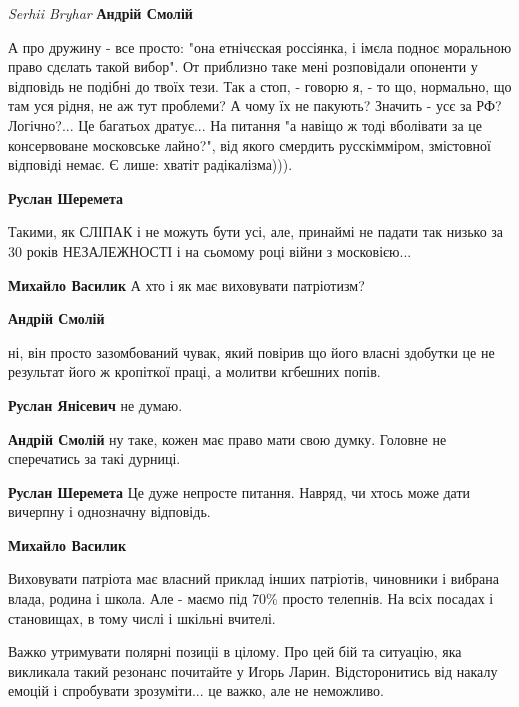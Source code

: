 \begin{itemize}
\begin{itemize}
\emph{Serhii Bryhar}
\textbf{Андрій Смолій} 

А про дружину - все просто: "она етнічєская россіянка, і імєла подноє моральною
право сдєлать такой вибор". От приблизно таке мені розповідали опоненти у
відповідь не подібні до твоїх тези. Так а стоп, - говорю я, - то що, нормально,
що там уся рідня, не аж тут проблеми? А чому їх не пакують? Значить - усє за
РФ? Логічно?... Це багатьох дратує... На питання "а навіщо ж тоді вболівати за
це консервоване московське лайно?", від якого смердить русскімміром, змістовної
відповіді немає. Є лише: хватіт радікалізма))).


\textbf{Руслан Шеремета}

Такими, як СЛІПАК і не можуть бути усі, але, принаймі не падати так низько за
30 років НЕЗАЛЕЖНОСТІ і на сьомому році війни з московією...


\textbf{Михайло Василик} А хто і як має виховувати патріотизм?

\textbf{Андрій Смолій} 

ні, він просто зазомбований чувак, який повірив що його власні здобутки це не
результат його ж кропіткої праці, а молитви кгбешних попів.



\textbf{Руслан Янісевич} не думаю.

\textbf{Андрій Смолій} ну таке, кожен має право мати свою думку. Головне не сперечатись за такі дурниці.

\textbf{Руслан Шеремета}
Це дуже непросте питання. Навряд, чи хтось може дати вичерпну і однозначну відповідь.

\textbf{Михайло Василик} 

Виховувати патріота має власний приклад інших патріотів, чиновники і вибрана
влада, родина і школа. Але - маємо під 70\% просто телепнів. На всіх посадах і
становищах, в тому числі і шкільні вчителі.

\end{itemize} %


Важко утримувати полярні позиціі в цілому. Про цей бій та ситуацію, яка
викликала такий резонанс почитайте у Игорь Ларин. Відсторонитись від накалу
емоцій і спробувати зрозуміти... це важко, але не неможливо.



\end{itemize}
